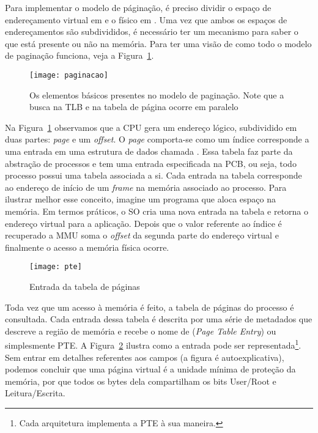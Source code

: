 Para implementar o modelo de páginação, é preciso dividir o espaço de
endereçamento virtual em  e o físico em
. Uma vez que ambos os espaços de endereçamentos são
subdivididos, é necessário ter um mecanismo para saber o que está presente ou
não na memória. Para ter uma visão de como todo o modelo de paginação funciona,
veja a Figura~\ref{fig:paginacao}.

\begin{figure}[!h]
  \centering
  \texttt{[image: paginacao]} 
  \caption{Os elementos básicos presentes no modelo de paginação. Note que a busca na TLB e na tabela de página ocorre em paralelo}
  \label{fig:paginacao}
\end{figure}

Na Figura~\ref{fig:paginacao} observamos que a CPU gera um endereço lógico,
subdividido em duas partes: \textit{page} e um \textit{offset}. O \emph{page}
comporta-se como um índice corresponde a uma entrada em uma estrutura de dados
chamada . Essa tabela faz parte da abstração
de processos e tem uma entrada especificada na PCB, ou seja, todo processo
possui uma tabela associada a si. Cada entrada na tabela corresponde ao
endereço de início de um \emph{frame} na memória associado ao processo.  Para
ilustrar melhor esse conceito, imagine um programa que aloca espaço na memória.
Em termos práticos, o SO cria uma nova entrada na tabela e retorna o endereço
virtual para a aplicação.  Depois que o valor referente ao índice é recuperado
a MMU soma o \textit{offset} da segunda parte do endereço virtual e finalmente
o acesso a memória física ocorre.

\begin{figure}[!h]
  \centering
  \texttt{[image: pte]}
  \caption{Entrada da tabela de páginas}
  \label{fig:pte}
\end{figure}

Toda vez que um acesso à memória é feito, a tabela de páginas do processo é
consultada. Cada entrada dessa tabela é descrita por uma série de metadados que
descreve a região de memória e recebe o nome de  (\textit{Page Table Entry}) ou simplesmente PTE. A
Figura~\ref{fig:pte} ilustra como a entrada pode ser representada\footnote{Cada
arquitetura implementa a PTE à sua maneira.}. Sem entrar em detalhes referentes
aos campos (a figura é autoexplicativa), podemos concluir que uma página
virtual é a unidade mínima de proteção da memória, por que todos os bytes dela
compartilham os bits User/Root e Leitura/Escrita.

